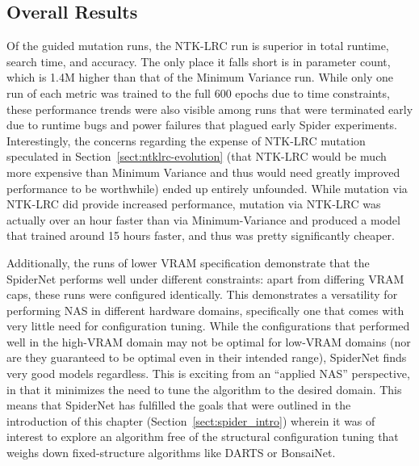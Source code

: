 \subsection{Overall Results}
Of the guided mutation runs, the NTK-LRC run is superior in total runtime, search time, and accuracy. The only
place it falls short is in parameter count, which is 1.4M higher than that of the Minimum Variance run. While
 only one run of each metric was trained to the full 600 epochs due to time constraints, these performance trends
were also visible among runs that were terminated early due to runtime bugs and power failures that plagued
early Spider experiments. Interestingly, the concerns regarding the expense of NTK-LRC mutation speculated in
Section~\ref{sect:ntklrc-evolution} (that NTK-LRC would be much more expensive than Minimum Variance and thus would
need greatly improved performance to be worthwhile) ended up entirely unfounded. While mutation via NTK-LRC did provide
increased performance, mutation via NTK-LRC was actually over an hour faster than via Minimum-Variance and produced
a model that trained around 15 hours faster, and thus was pretty significantly cheaper.

Additionally, the runs of lower VRAM specification demonstrate that the SpiderNet performs well under different constraints:
apart from differing VRAM caps, these runs were configured identically. This demonstrates a versatility for performing
NAS in different hardware domains, specifically one that comes with very little need for configuration tuning. While
the configurations that performed well in the high-VRAM domain may not be optimal for low-VRAM domains (nor are
they guaranteed to be optimal even in their intended range), SpiderNet finds very good models regardless. This is exciting
from an ``applied NAS'' perspective, in that it minimizes the need to tune the algorithm to the desired domain.
This means that SpiderNet has fulfilled the goals that were outlined in the introduction of this chapter (Section~\ref{sect:spider_intro}) wherein
it was of interest to explore an algorithm free of the structural configuration tuning that weighs down fixed-structure algorithms like
DARTS or BonsaiNet.

